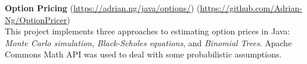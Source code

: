 \documentclass[letterpaper,11pt]{article}
\newcommand{\resumeItem}[3]{
	\item\small{
		\textbf{#1}\hfill\tiny{#2\\}\small{ #3 \vspace{-2pt}}
	}
}
\newcommand{\resumeSubItem}[3]{\resumeItem{#1}{#2}{#3}\vspace{-2pt}}
\begin{document}

\resumeSubItem{Option Pricing}
{
	(\href{https://adrian.ng/java/options/}{https://adrian.ng/java/options/}) \quad (\href{https://github.com/Adrian-Ng/OptionPricer}{https://github.com/Adrian-Ng/OptionPricer})
}
{
	This project implements three approaches to estimating option prices in Java: \textit{Monte Carlo simulation}, \textit{Black-Scholes equations}, and \textit{Binomial Trees}.	Apache Commons Math API was used to deal with some probabilistic assumptions.
}
\end{document}
